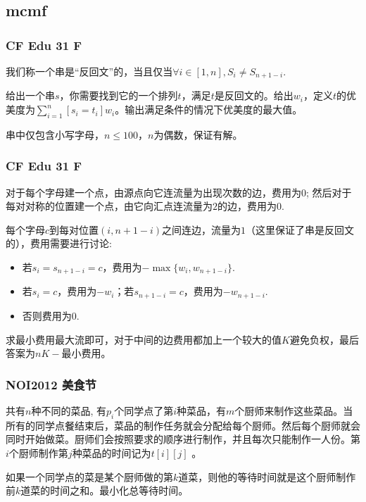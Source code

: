 \documentclass[10pt]{beamer}
\begin{document}
\begin{CJK}{UTF8}{gkai}
\begin{spacing}{1.1}
\begin{frame}
\end{frame}

\subsection{mcmf}

\begin{frame}
\frametitle{CF Edu 31 F}

	我们称一个串是“反回文”的，当且仅当$\forall i \in [1, n], S_i \ne S_{n + 1 - i}$.

	给出一个串$s$，你需要找到它的一个排列$t$，满足$t$是反回文的。给出$w_i$，定义$t$的优美度为$\sum_{i = 1}^n [s_i = t_i] w_i$。输出满足条件的情况下优美度的最大值。

	串中仅包含小写字母，$n \le 100$，$n$为偶数，保证有解。

\end{frame}

\begin{frame}
\frametitle{CF Edu 31 F}

	对于每个字母建一个点，由源点向它连流量为出现次数的边，费用为$0$; 然后对于每对对称的位置建一个点，由它向汇点连流量为$2$的边，费用为$0$. \pause

	每个字母$c$到每对位置$(i, n + 1 - i)$之间连边，流量为$1$（这里保证了串是反回文的），费用需要进行讨论: \pause

	\begin{itemize}
		\item 若$s_i = s_{n + 1 - i} = c$，费用为$-\max\{w_i, w_{n + 1 - i}\}$.
		\item 若$s_i = c$，费用为$-w_i$；若$s_{n + 1 - i} = c$，费用为$-w_{n + 1 - i}$.
		\item 否则费用为$0$.
	\end{itemize} \pause

	求最小费用最大流即可，对于中间的边费用都加上一个较大的值$K$避免负权，最后答案为$nK - $最小费用。

\end{frame}

\begin{frame}
\frametitle{NOI2012 美食节}
	共有$n$种不同的菜品, 有$p_i$个同学点了第$i$种菜品，有$m$个厨师来制作这些菜品。当所有的同学点餐结束后，菜品的制作任务就会分配给每个厨师。然后每个厨师就会同时开始做菜。厨师们会按照要求的顺序进行制作，并且每次只能制作一人份。第$i$个厨师制作第$j$种菜品的时间记为$t[i][j]$ 。
	
	如果一个同学点的菜是某个厨师做的第$k$道菜，则他的等待时间就是这个厨师制作前$k$道菜的时间之和。最小化总等待时间。


\end{frame}
\end{spacing}
\end{CJK}
\end{document}
